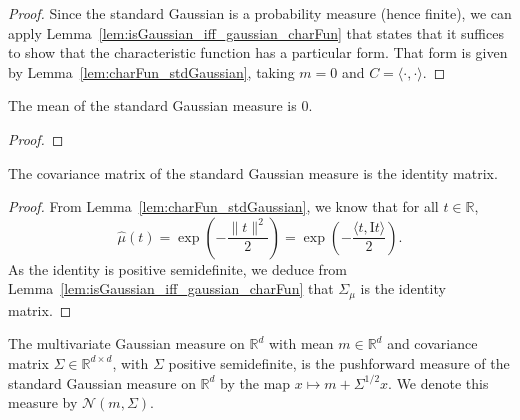 \begin{proof}\leanok
Since the standard Gaussian is a probability measure (hence finite), we can apply Lemma~\ref{lem:isGaussian_iff_gaussian_charFun} that states that it suffices to show that the characteristic function has a particular form.
That form is given by Lemma~\ref{lem:charFun_stdGaussian}, taking $m=0$ and $C = \langle\cdot, \cdot\rangle$.
\end{proof}


\begin{lemma}\label{lem:integral_id_stdGaussian}
  \leanok
The mean of the standard Gaussian measure is $0$.
\end{lemma}

\begin{proof}\leanok

\end{proof}


\begin{lemma}\label{lem:covMatrix_stdGaussian}
  \leanok
The covariance matrix of the standard Gaussian measure is the identity matrix.
\end{lemma}

\begin{proof}\leanok
From Lemma~\ref{lem:charFun_stdGaussian}, we know that for all $t \in \mathbb{R}$,
$$\hat{\mu}(t) = \exp\left(-\frac{\|t\|^2}{2}\right) = \exp\left(-\frac{\langle t, \mathrm{I}t\rangle}{2}\right).$$
As the identity is positive semidefinite, we deduce from Lemma~\ref{lem:isGaussian_iff_gaussian_charFun} that $\Sigma_\mu$ is the identity matrix.
\end{proof}


\begin{definition}\label{def:multivariateGaussian}
  \leanok
The multivariate Gaussian measure on $\mathbb{R}^d$ with mean $m \in \mathbb{R}^d$ and covariance matrix $\Sigma \in \mathbb{R}^{d \times d}$, with $\Sigma$ positive semidefinite, is the pushforward measure of the standard Gaussian measure on $\mathbb{R}^d$ by the map $x \mapsto m + \Sigma^{1/2} x$.
We denote this measure by $\mathcal{N}(m, \Sigma)$.
\end{definition}


